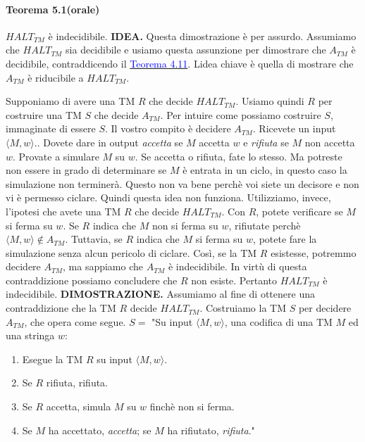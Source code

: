 \documentclass{article}
\begin{document}
\paragraph{Teorema 5.1(orale)}
\label{teorema-5.1}
\text{}
\newline
$HALT_{TM}$ è indecidibile.
\vspace{1em}
\text{}
\newline
\hbox{\textbf{IDEA.}}
Questa dimostrazione è per assurdo.
Assumiamo che $HALT_{TM}$ sia decidibile e usiamo questa assunzione per dimostrare che $A_{TM}$ è decidibile, contraddicendo il \hyperref[teorema-4.11]{\textcolor{blue}{Teorema 4.11}}.
Lidea chiave è quella di mostrare che $A_{TM}$ è riducibile a $HALT_{TM}$.

Supponiamo di avere una TM $R$ che decide $HALT_{TM}$.
Usiamo quindi $R$ per costruire una TM $S$ che decide $A_{TM}$.
Per intuire come possiamo costruire $S$, immaginate di essere $S$.
Il vostro compito è decidere $A_{TM}$.
Ricevete un input $\langle M,w \rangle$..
Dovete dare in output \textit{accetta} se $M$ accetta $w$ e \textit{rifiuta} se $M$ non accetta $w$.
Provate a simulare $M$ su $w$.
Se accetta o rifiuta, fate lo stesso.
Ma potreste non essere in grado di determinare se $M$ è entrata in un ciclo, in questo caso la simulazione non terminerà.
Questo non va bene perchè voi siete un decisore e non vi è permesso ciclare.
Quindi questa idea non funziona.
Utilizziamo, invece, l'ipotesi che avete una TM $R$ che decide $HALT_{TM}$.
Con $R$, potete verificare se $M$ si ferma su $w$.
Se $R$ indica che $M$ non si ferma su $w$, rifiutate perchè $\langle M,w \rangle \notin A_{TM}$.
Tuttavia, se $R$ indica che $M$ si ferma su $w$, potete fare la simulazione senza alcun pericolo di ciclare.
Così, se la TM $R$ esistesse, potremmo decidere $A_{TM}$, ma sappiamo che $A_{TM}$ è indecidibile.
In virtù di questa contraddizione possiamo concludere che $R$ non esiste.
Pertanto $HALT_{TM}$ è indecidibile.
\vspace{1em}
\text{}
\newline
\hbox{\textbf{DIMOSTRAZIONE.}}
Assumiamo al fine di ottenere una contraddizione che la TM $R$ decide $HALT_{TM}$.
Costruiamo la TM $S$ per decidere $A_{TM}$, che opera come segue.
\vspace{1em}
\text{}
\newline
$S = $ "Su input $\langle M,w \rangle$, una codifica di una TM $M$ ed una stringa $w$:
\begin{enumerate}
    \item Esegue la TM $R$ su input $\langle M,w \rangle$.
    \item Se $R$ rifiuta, rifiuta.
    \item Se $R$ accetta, simula $M$ su $w$ finchè non si ferma.
    \item Se $M$ ha accettato, \textit{accetta}; se $M$ ha rifiutato, \textit{rifiuta}."
\end{enumerate}
\end{document}
